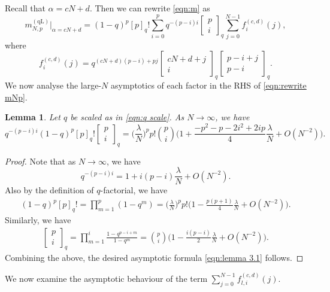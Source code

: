 \documentclass{amsart}
\newcommand{\qbinom}[2]{{\begin{bmatrix}#1\\#2\end{bmatrix}}_q}
\theoremstyle{plain}
\newtheorem{lem}[thm]{Lemma}
\theoremstyle{remark}
\numberwithin{equation}{section}
\begin{document}
Recall that $\alpha=cN+d$. Then we can rewrite \eqref{eqn:m} as 
\begin{equation}\label{eqn:rewrite mNp}
  {m}_{N,p}^{(\mathrm{qL})}\Big|_{\alpha=cN+d}
    =(1-q)^{p}[p]_{q}!\sum_{i=0}^{p}q^{-(p-i)i}\qbinom{p}{i}\sum_{j=0}^{N-1}f_{i}^{(c,d)}(j),
\end{equation}
where 
\begin{equation}
    f_{i}^{(c,d)}(j)=q^{(cN+d)(p-i)+pj}\qbinom{cN+d+j}{i}\qbinom{p-i+j}{p-i}. 
\end{equation}
We now analyse the large-$N$ asymptotics of each factor in the RHS of \eqref{eqn:rewrite mNp}.
  

\begin{lem}\label{lem:large N of qfactorials}
    Let $q$ be scaled as in \eqref{eqn:q scale}. As $N\rightarrow\infty$, we have
    \begin{equation}\label{eqn:lemma 3.1}
        q^{-(p-i)i}(1-q)^{p}[p]_{q}!\qbinom{p}{i}
        =\Big(\frac{\lambda}{N}\Big)^{p}p!\binom{p}{i}\Big(1+\frac{-p^{2}-p-2i^{2}+2ip}{4}\frac{\lambda}{N}+O(N^{-2})\Big).
    \end{equation}
\end{lem}

\begin{proof}
Note that as $N \to \infty$, we have 
    \begin{equation*}
        q^{-(p-i)i}=1+i(p-i)  \frac{ \lambda}{N}+O(N^{-2}).
    \end{equation*}
Also by the definition of $q$-factorial, we have 
\begin{align*}
 (1-q)^{p}[p]_{q}!=\prod_{m=1}^{p}(1-q^{m})=\Big(\frac{\lambda}{N}\Big)^{p}p!\Big(1-\frac{p(p+1)}{4}\frac{\lambda}{N}+O(N^{-2})\Big). 
\end{align*} 
Similarly, we have 
\begin{align*}
\qbinom{p}{i}=\prod_{m=1}^{i}\frac{1-q^{p-i+m}}{1-q^{m}} =\binom{p}{i}\Big(1-\frac{i(p-i)}{2}\frac{\lambda}{N}+O(N^{-2})\Big).
\end{align*}
Combining the above, the desired asymptotic formula \eqref{eqn:lemma 3.1} follows. 
\end{proof}

We now examine the asymptotic behaviour of the term $\sum_{j=0}^{N-1}f_{l,i}^{(c,d)}(j)$.
\end{document}

